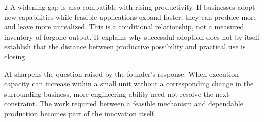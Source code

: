 \begin{multicols}{2}
A widening gap is also compatible with rising productivity. If
businesses adopt new capabilities while feasible applications expand
faster, they can produce more and leave more unrealized. This is a
conditional relationship, not a measured inventory of forgone output. It
explains why successful adoption does not by itself establish that the
distance between productive possibility and practical use is closing.

AI sharpens the question raised by the founder's response. When
execution capacity can increase within a small unit without a
corresponding change in the surrounding business, more engineering
ability need not resolve the next constraint. The work required between
a feasible mechanism and dependable production becomes part of the
innovation itself.

\end{multicols}

\FactoryRetrofitArt

